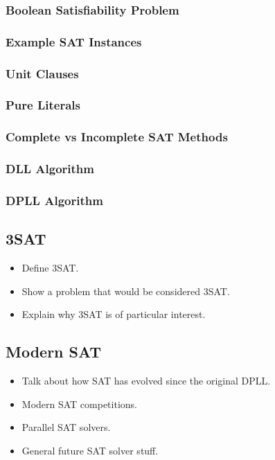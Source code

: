 \documentclass{article}
\begin{document}
\subsubsection{Boolean Satisfiability Problem}
\lipsum[1-2]
\subsubsection{Example SAT Instances}
\lipsum[1-2]
\subsubsection{Unit Clauses}
\lipsum[1-2]
\subsubsection{Pure Literals}
\lipsum[1-2]
\subsubsection{Complete vs Incomplete SAT Methods}
\lipsum[1-2]
\subsubsection{DLL Algorithm}
\lipsum[1-2]
\subsubsection{DPLL Algorithm}
\lipsum[1-2]

\subsection{3SAT}
\begin{itemize}
    \item Define 3SAT.
    \item Show a problem that would be considered 3SAT.
    \item Explain why 3SAT is of particular interest.
\end{itemize}

\subsection{Modern SAT}
\begin{itemize}
    \item Talk about how SAT has evolved since the original DPLL.
    \item Modern SAT competitions.
    \item Parallel SAT solvers.
    \item General future SAT solver stuff.
\end{itemize}
\end{document}
